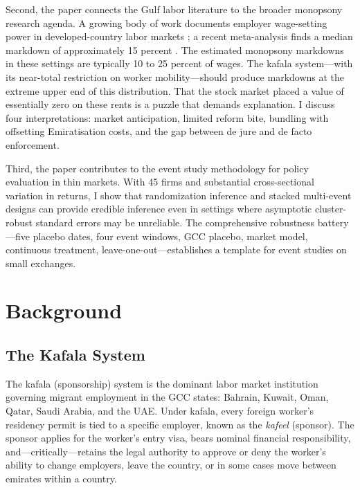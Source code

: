 \documentclass[12pt]{article}
\begin{document}
Second, the paper connects the Gulf labor literature to the broader monopsony research agenda. A growing body of work documents employer wage-setting power in developed-country labor markets \citep{card2018firms, azar2020labor, benmelech2022strong, prager2021employer, bassier2022monopsony}; a recent meta-analysis finds a median markdown of approximately 15 percent \citep{sokolova2021monopsony}. The estimated monopsony markdowns in these settings are typically 10 to 25 percent of wages. The kafala system---with its near-total restriction on worker mobility---should produce markdowns at the extreme upper end of this distribution. That the stock market placed a value of essentially zero on these rents is a puzzle that demands explanation. I discuss four interpretations: market anticipation, limited reform bite, bundling with offsetting Emiratisation costs, and the gap between de jure and de facto enforcement.

Third, the paper contributes to the event study methodology for policy evaluation in thin markets. With 45 firms and substantial cross-sectional variation in returns, I show that randomization inference and stacked multi-event designs can provide credible inference even in settings where asymptotic cluster-robust standard errors may be unreliable. The comprehensive robustness battery---five placebo dates, four event windows, GCC placebo, market model, continuous treatment, leave-one-out---establishes a template for event studies on small exchanges.


\section{Background}\label{sec:background}

\subsection{The Kafala System}

The kafala (sponsorship) system is the dominant labor market institution governing migrant employment in the GCC states: Bahrain, Kuwait, Oman, Qatar, Saudi Arabia, and the UAE. Under kafala, every foreign worker's residency permit is tied to a specific employer, known as the \emph{kafeel} (sponsor). The sponsor applies for the worker's entry visa, bears nominal financial responsibility, and---critically---retains the legal authority to approve or deny the worker's ability to change employers, leave the country, or in some cases move between emirates within a country.
\end{document}
